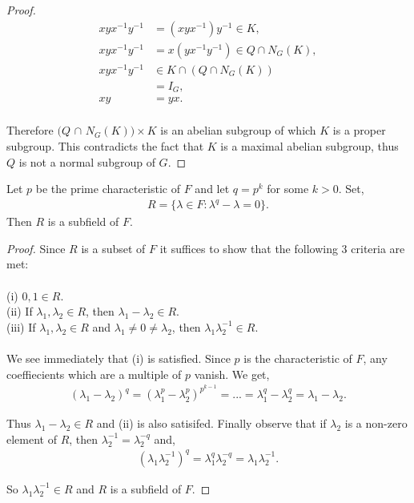 \begin{proof}
\begin{align*} xyx^{-1}y^{-1} &=  (xyx^{-1})y^{-1} \in K, \tag{since $K \vartriangleleft N_G(K)$} \\
xyx^{-1}y^{-1} &= x(yx^{-1}y^{-1}) \in Q \cap N_G(K), \tag{since $Q \cap N_G(K) \vartriangleleft N_G(K)$} \\
xyx^{-1}y^{-1} &\in K \cap ( Q \cap N_G(K)) \\
&= I_G, \tag{since gcd$(|Q \cap N_G(K)|,|K|) = 1$} \\
xy &= yx. \\
\end{align*}

Therefore $(Q$ $\cap$ $N_G(K)) \times K$ is an abelian subgroup of which $K$ is a proper subgroup. This contradicts the fact that $K$ is a maximal abelian subgroup, thus $Q$ is not a normal subgroup of $G$.

\end{proof}


\begin{lemma}
    \label{subfield} Let $p$ be the prime characteristic of $F$ and let $q= p^k$ for some $k>0$. Set,
\begin{align}\label{RRR} R = \{ \lambda \in F : \lambda^q -\lambda = 0 \}.
\end{align}
Then $R$ is a subfield of $F$.
\end{lemma}

\begin{proof} Since $R$ is a subset of $F$ it suffices to show that the following 3 criteria are met: \\
\\
(i) $0, 1 \in R$. \\
(ii) If $\lambda_1, \lambda_2 \in R$, then $\lambda_1 - \lambda_2 \in R$. \\
(iii) If $\lambda_1, \lambda_2 \in R$ and $\lambda_1 \neq 0 \neq \lambda_2$, then $\lambda_1 \lambda^{-1}_2 \in R$. \\
\\
We see immediately that (i) is satisfied. Since $p$ is the characteristic of $F$, any coeffiecients which are a multiple of $p$ vanish. We get,
\begin{align*} (\lambda_1 - \lambda_2)^q = (\lambda^p_1 - \lambda^p_2)^{p^{k-1}} = ... = \lambda^q_1 - \lambda^q_2 = \lambda_1 - \lambda_2.
\end{align*}

Thus $\lambda_1 - \lambda_2 \in R$ and (ii) is also satisifed. Finally observe that if $\lambda_2$ is a non-zero element of $R$, then $\lambda^{-1}_2 = \lambda^{-q}_2$ and,
\begin{align*} (\lambda_1 \lambda^{-1}_2)^q = \lambda^q_1 \lambda^{-q}_2 = \lambda_1 \lambda^{-1}_2.
\end{align*}

So $\lambda_1 \lambda^{-1}_2 \in R$ and $R$ is a subfield of $F$.

\end{proof}


